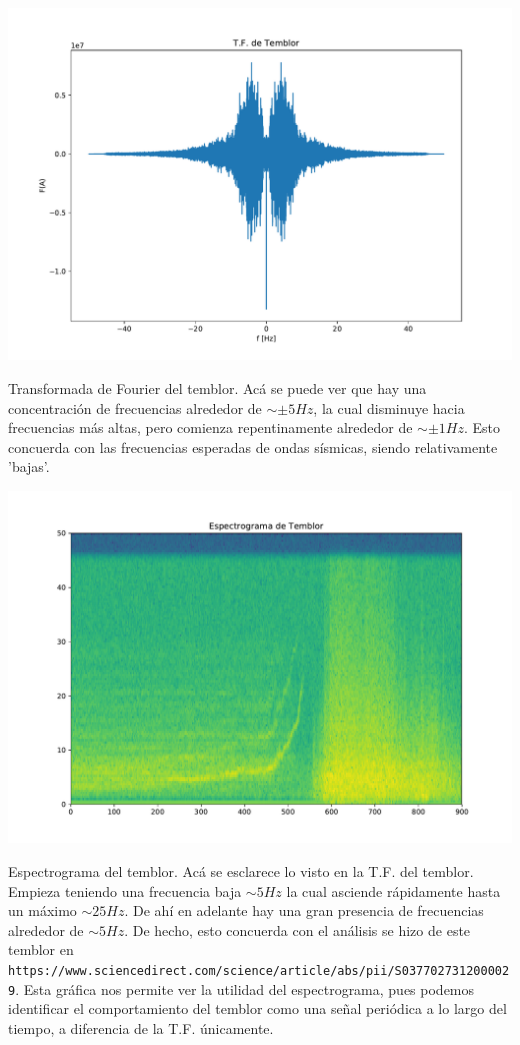\documentclass[11pt,letterpaper]{exam}
\begin{document}
\begin{center}
\includegraphics[width=14cm]{2_FourierTemblor.pdf}
\end{center}
{Transformada de Fourier del temblor. Acá se puede ver que hay una concentración de frecuencias alrededor de $\sim\pm 5 Hz$, la cual disminuye hacia frecuencias más altas, pero comienza repentinamente alrededor de $\sim\pm 1 Hz$. Esto concuerda con las frecuencias esperadas de ondas sísmicas, siendo relativamente 'bajas'. }
\begin{center}
\includegraphics[width=14cm]{2_EspectrogramaTemblor.pdf}
\end{center}
Espectrograma del temblor. Acá se esclarece lo visto en la T.F. del temblor. Empieza teniendo una frecuencia baja $\sim 5 Hz$ la cual asciende rápidamente hasta un máximo $\sim 25 Hz$. De ahí en adelante hay una gran presencia de frecuencias alrededor de $\sim 5 Hz$. De hecho, esto concuerda con el análisis se hizo de este temblor en \texttt{https://www.sciencedirect.com/science/article/abs/pii/S0377027312000029}. Esta gráfica nos permite ver la utilidad del espectrograma, pues podemos identificar el comportamiento del temblor como una señal periódica a lo largo del tiempo, a diferencia de la T.F. únicamente. 
\end{document}

